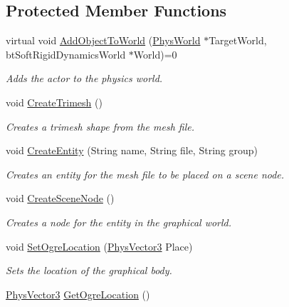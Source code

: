 \subsection*{Protected Member Functions}
\begin{DoxyCompactItemize}
\item 
virtual void \hyperlink{classActorBase_a1af82a2ed960fd114518fdf84d5ff146}{AddObjectToWorld} (\hyperlink{classPhysWorld}{PhysWorld} $\ast$TargetWorld, btSoftRigidDynamicsWorld $\ast$World)=0
\begin{DoxyCompactList}\small\item\em Adds the actor to the physics world. \item\end{DoxyCompactList}\item 
void \hyperlink{classActorBase_af7f0806222c79b5d5120dccefd93715e}{CreateTrimesh} ()
\begin{DoxyCompactList}\small\item\em Creates a trimesh shape from the mesh file. \item\end{DoxyCompactList}\item 
void \hyperlink{classActorBase_a7fd55114a59fe098a217314cf29cd055}{CreateEntity} (String name, String file, String group)
\begin{DoxyCompactList}\small\item\em Creates an entity for the mesh file to be placed on a scene node. \item\end{DoxyCompactList}\item 
void \hyperlink{classActorBase_a168cd57e20b2adfc5cae21627ddbae31}{CreateSceneNode} ()
\begin{DoxyCompactList}\small\item\em Creates a node for the entity in the graphical world. \item\end{DoxyCompactList}\item 
void \hyperlink{classActorBase_a3140cc5c1c630efc1c04c20ada319b8b}{SetOgreLocation} (\hyperlink{classPhysVector3}{PhysVector3} Place)
\begin{DoxyCompactList}\small\item\em Sets the location of the graphical body. \item\end{DoxyCompactList}\item 
\hyperlink{classPhysVector3}{PhysVector3} \hyperlink{classActorBase_a73ee03084b2ca78659b6e6439cafa75f}{GetOgreLocation} ()

\end{DoxyCompactItemize}
